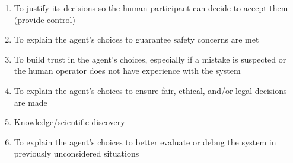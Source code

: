 \begin{enumerate}
    \item To justify its decisions so the human participant can decide to accept them (provide control)
    \item To explain the agent’s choices to guarantee safety concerns are met
    \item To build trust in the agent’s choices, especially if a mistake is suspected or the human operator does not have experience with the system
    \item To explain the agent’s choices to ensure fair, ethical, and/or legal decisions are made
    \item Knowledge/scientific discovery
    \item To explain the agent’s choices to better evaluate or debug the system in previously unconsidered situations
\end{enumerate}